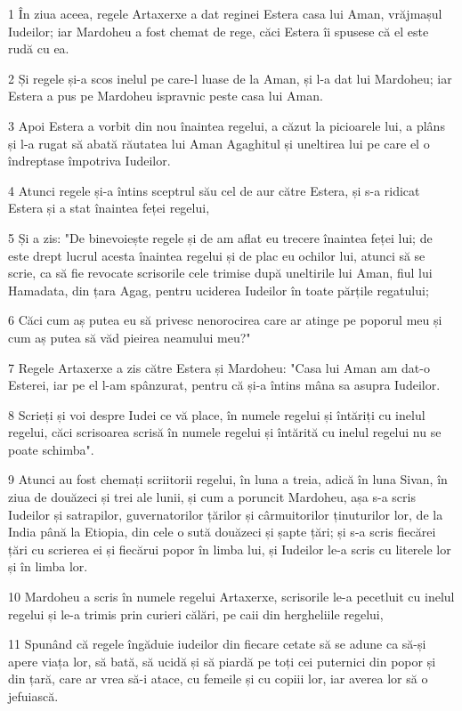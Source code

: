 \par 1 În ziua aceea, regele Artaxerxe a dat reginei Estera casa lui Aman, vrăjmașul Iudeilor; iar Mardoheu a fost chemat de rege, căci Estera îi spusese că el este rudă cu ea.
\par 2 Și regele și-a scos inelul pe care-l luase de la Aman, și l-a dat lui Mardoheu; iar Estera a pus pe Mardoheu ispravnic peste casa lui Aman.
\par 3 Apoi Estera a vorbit din nou înaintea regelui, a căzut la picioarele lui, a plâns și l-a rugat să abată răutatea lui Aman Agaghitul și uneltirea lui pe care el o îndreptase împotriva Iudeilor.
\par 4 Atunci regele și-a întins sceptrul său cel de aur către Estera, și s-a ridicat Estera și a stat înaintea feței regelui,
\par 5 Și a zis: "De binevoiește regele și de am aflat eu trecere înaintea feței lui; de este drept lucrul acesta înaintea regelui și de plac eu ochilor lui, atunci să se scrie, ca să fie revocate scrisorile cele trimise după uneltirile lui Aman, fiul lui Hamadata, din țara Agag, pentru uciderea Iudeilor în toate părțile regatului;
\par 6 Căci cum aș putea eu să privesc nenorocirea care ar atinge pe poporul meu și cum aș putea să văd pieirea neamului meu?"
\par 7 Regele Artaxerxe a zis către Estera și Mardoheu: "Casa lui Aman am dat-o Esterei, iar pe el l-am spânzurat, pentru că și-a întins mâna sa asupra Iudeilor.
\par 8 Scrieți și voi despre Iudei ce vă place, în numele regelui și întăriți cu inelul regelui, căci scrisoarea scrisă în numele regelui și întărită cu inelul regelui nu se poate schimba".
\par 9 Atunci au fost chemați scriitorii regelui, în luna a treia, adică în luna Sivan, în ziua de douăzeci și trei ale lunii, și cum a poruncit Mardoheu, așa s-a scris Iudeilor și satrapilor, guvernatorilor țărilor și cârmuitorilor ținuturilor lor, de la India până la Etiopia, din cele o sută douăzeci și șapte țări; și s-a scris fiecărei țări cu scrierea ei și fiecărui popor în limba lui, și Iudeilor le-a scris cu literele lor și în limba lor.
\par 10 Mardoheu a scris în numele regelui Artaxerxe, scrisorile le-a pecetluit cu inelul regelui și le-a trimis prin curieri călări, pe caii din hergheliile regelui,
\par 11 Spunând că regele îngăduie iudeilor din fiecare cetate să se adune ca să-și apere viața lor, să bată, să ucidă și să piardă pe toți cei puternici din popor și din țară, care ar vrea să-i atace, cu femeile și cu copiii lor, iar averea lor să o jefuiască.
